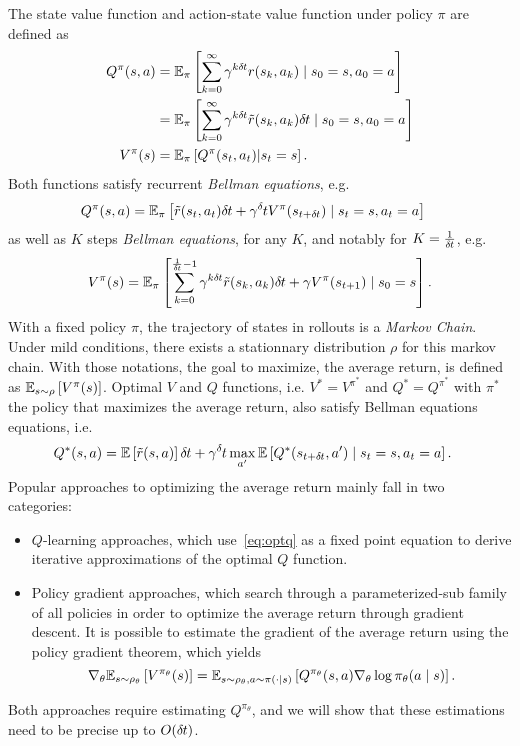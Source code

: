 The state value function and action-state value function under policy
$\pi$ are defined as
\begin{align}
	Q^\pi(s, a) &= \mathbb{E}_\pi\left[
		\sum\limits_{k=0}^\infty
	{\gamma}^{k \delta\hspace{-.06em}t} r(s_k, a_k)
		\mid
		s_0 = s, a_0 = a
	\right]\\
	&= \mathbb{E}_\pi\left[
		\sum\limits_{k=0}^\infty
		{\gamma}^{k \delta\hspace{-.06em}t} \tilde{r}(s_k, a_k) \delta\hspace{-.06em}t
		\mid
		s_0 = s, a_0 = a
	\right]\\
	V^\pi(s) &= \mathbb{E}_\pi\left[Q^\pi(s_t, a_t) | s_t=s\right].
\end{align}
Both functions satisfy recurrent \emph{Bellman equations}, e.g.
\begin{align}
	Q^\pi(s, a) &= \BE_\pi\left[
		\tilde{r}(s_t, a_t) \deltat + \gamma^\deltat V^\pi(s_{t + \deltat})
		\mid
	s_t = s, a_t = a\right]
\end{align}
as well as $K$ steps \emph{Bellman equations}, for any $K$, and notably for
$K = \frac{1}{\delta\hspace{-.06em}t}$, e.g.
\begin{align}
	V^\pi(s) = \mathbb{E}_\pi\left[
		\sum\limits_{k=0}^{\frac{1}{\delta\hspace{-.06em}t} - 1} \gamma^{k\delta\hspace{-.06em}t} \tilde{r}(s_k, a_k) \delta\hspace{-.06em}t + \gamma V^\pi(s_{t + 1})
		\mid
	s_0 = s\right].
\end{align}
With a fixed policy $\pi$, the trajectory of states in rollouts is a
\emph{Markov Chain}. Under mild conditions, there exists a stationnary
distribution $\rho$ for this markov chain. With those notations, the goal to
maximize, the average return, is defined as
$\mathbb{E}_{s\sim\rho}\left[V^{\pi}(s)\right]$.
Optimal $V$ and $Q$ functions, i.e. $V^*=V^{\pi^*}$ and $Q^*=Q^{\pi^*}$ with
$\pi^*$ the policy that maximizes the average return, also satisfy Bellman equations
equations, i.e.
\begin{align}
	Q^*(s, a) &= \BE\left[
		\tilde{r}(s, a) \right] \deltat + \gamma^\deltat \max\limits_{a'} \BE\left[Q^*(s_{t + \deltat}, a')
		\mid
	s_t = s, a_t = a\right].
	\label{eq:optq}
\end{align}
Popular approaches to optimizing
the average return mainly fall in two categories:
\begin{itemize}
	\item $Q$-learning approaches, which use~\eqref{eq:optq} as a fixed point equation
		to derive iterative approximations of the optimal $Q$ function.
	\item Policy gradient approaches, which search through a parameterized-sub family of
		all policies in order to optimize the average return through gradient descent. 
		It is possible to estimate the gradient of the average return
		using the policy gradient theorem, which yields
		\begin{equation}
			\nabla_\theta\mathbb{E}_{s\sim\rho_\theta}\left[V^{\pi_\theta}(s)\right]
			=
			\mathbb{E}_{s\sim\rho_\theta, a\sim\pi(\cdot\mid s)}\left[
				Q^{\pi_\theta}(s, a)
				\nabla_\theta \log \pi_\theta(a \mid s)
			\right].
		\end{equation}
\end{itemize}
Both approaches require estimating $Q^{\pi_\theta}$, and we will show that these
estimations need to be precise up to $O (\delta\hspace{-.06em}t)$.

